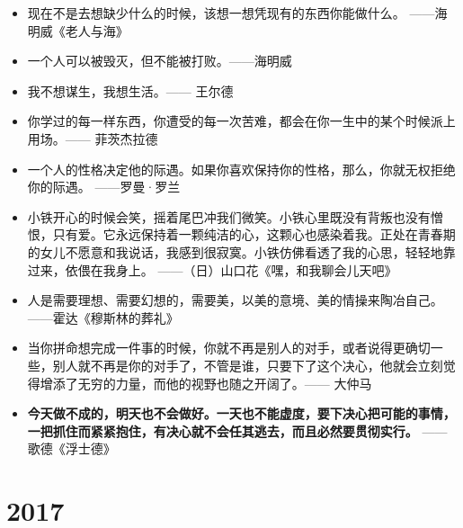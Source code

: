 \documentclass[UTF8,a4paper,8pt]{ctexbook}
\begin{document}
\begin{itemize}
		\item 现在不是去想缺少什么的时候，该想一想凭现有的东西你能做什么。	——海明威《老人与海》
		
		\item 一个人可以被毁灭，但不能被打败。——海明威
		
		\item 我不想谋生，我想生活。—— 王尔德
		
		\item 你学过的每一样东西，你遭受的每一次苦难，都会在你一生中的某个时候派上用场。—— 菲茨杰拉德
		
		\item 一个人的性格决定他的际遇。如果你喜欢保持你的性格，那么，你就无权拒绝你的际遇。	——罗曼·罗兰
		
		\item 小铁开心的时候会笑，摇着尾巴冲我们微笑。小铁心里既没有背叛也没有憎恨，只有爱。它永远保持着一颗纯洁的心，这颗心也感染着我。正处在青春期的女儿不愿意和我说话，我感到很寂寞。小铁仿佛看透了我的心思，轻轻地靠过来，依偎在我身上。	——（日）山口花《嘿，和我聊会儿天吧》
		
		\item 人是需要理想、需要幻想的，需要美，以美的意境、美的情操来陶冶自己。	——霍达《穆斯林的葬礼》
		
		\item 当你拼命想完成一件事的时候，你就不再是别人的对手，或者说得更确切一些，别人就不再是你的对手了，不管是谁，只要下了这个决心，他就会立刻觉得增添了无穷的力量，而他的视野也随之开阔了。—— 大仲马
		
		\item \textbf{今天做不成的，明天也不会做好。一天也不能虚度，要下决心把可能的事情，一把抓住而紧紧抱住，有决心就不会任其逃去，而且必然要贯彻实行。}	——歌德《浮士德》
	\end{itemize}

\chapter{2017}
\end{document}
